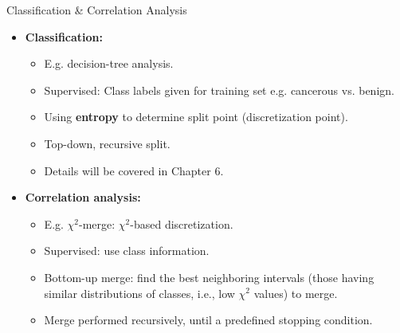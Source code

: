 \begin{frame}{Classification \& Correlation Analysis}
	\begin{itemize}
		\item \textbf{Classification:}
		      \begin{itemize}
			      \item E.g. decision-tree analysis.
			      \item Supervised: Class labels given for training set e.g.
			            cancerous vs. benign.
			      \item Using \textbf{entropy} to determine split point
			            (discretization point).
			      \item Top-down, recursive split.
			      \item Details will be covered in Chapter 6.
		      \end{itemize}
		\item \textbf{Correlation analysis:}
		      \begin{itemize}
			      \item E.g. $\chi^2$-merge: $\chi^2$-based discretization.
			      \item Supervised: use class information.
			      \item Bottom-up merge: find the best neighboring intervals (those
			            having similar distributions of classes, i.e., low $\chi^2$ values)
			            to merge.
			      \item Merge performed recursively, until a predefined stopping
			            condition.
		      \end{itemize}
	\end{itemize}
\end{frame}

